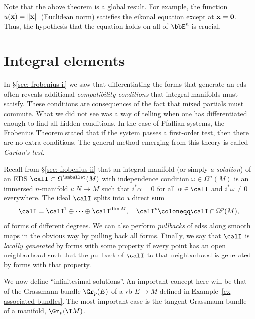 \begin{rem}
    Note that the above theorem is a global result. For example, the function $u(\bf{x})=\lVert\bf{x}\rVert$ (Euclidean norm) satisfies the eikonal equation except at $\bf{x}=0$. Thus, the hypothesis that the equation holds on all of $\bbE^n$ is crucial.
\end{rem}












\section{Integral elements}


In \S\ref{sec: frobenius ii} we saw that differentiating the forms that generate an \gls{eds} often reveals additional \emph{compatibility conditions} that integral manifolds must satisfy. These conditions are consequences of the fact that mixed partials must commute. What we did not see was a way of telling when one has differentiated enough to find all hidden conditions. In the case of Pfaffian systems, the Frobenius Theorem stated that if the system passes a first-order test, then there are no extra conditions. The general method emerging from this theory is called \emph{Cartan's test}.

Recall from \S\ref{sec: frobenius ii} that an integral manifold (or simply \emph{a solution}) of an EDS $\calI\subset\Omega^{\smbullet }(M)$ with independence condition $\omega\in\Omega^n(M)$ is an immersed $n$-manifold  $i:N\to M$ such that $i^\ast\alpha=0$ for all $\alpha\in \calI$ and $i^\ast \omega\neq 0$ everywhere. The ideal $\calI$ splits into a direct sum 
\[\calI=\calI^1\oplus\cdots\oplus \calI^{\dim M},\quad \calI^p\coloneqq \calI\cap \Omega^p(M),\]
of forms of different degrees. We can also perform \emph{pullbacks} of \glspl{eds} along smooth maps in the obvious way by pulling back all forms. Finally, we say that $\calI$ is \emph{locally generated} by forms with some property if every point has an open neighborhood such that the pullback of $\calI$ to that neighborhood is generated by forms with that property.

We now define ``infinitesimal solutions''. An important concept here will be that of the Grassmann bundle $\Gr_p(E)$ of a \gls{vb} $E\to M$ defined in Example~\ref{ex associated bundles}. The most important case is the tangent Grassmann bundle of a manifold, $\Gr_p(\T M)$.

